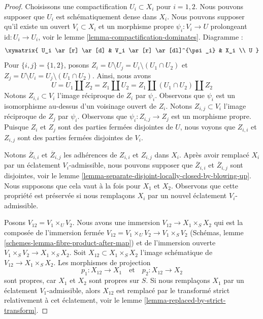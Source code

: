 \begin{proof}
Choisissons une compactification $U_i \subset X_i$ pour $i = 1, 2$. Nous pouvons
supposer que $U_i$ est schématiquement dense dans $X_i$. Nous pouvons supposer qu'il
existe un ouvert $V_i \subset X_i$ et un morphisme propre
$\psi_i : V_i \to U$ prolongeant $\text{id} : U_i \to U_i$, voir
le lemme \ref{lemma-compactification-dominates}. Diagramme :
$$
\xymatrix{
U_i \ar[r] \ar[d] & V_i \ar[r] \ar[dl]^{\psi_i} & X_i \\
U
}
$$
Pour $\{i, j\} = \{1, 2\}$, posons
$Z_i = U \setminus U_j = U_i \setminus (U_1 \cap U_2)$
et
$Z_j = U \setminus U_i = U_j \setminus (U_1 \cap U_2)$.
Ainsi, nous avons
$$
U = U_1 \amalg Z_2 = Z_1 \amalg U_2 = Z_1 \amalg (U_1 \cap U_2) \amalg Z_2
$$
Notons $Z_{i, i} \subset V_i$ l'image réciproque de $Z_i$ par $\psi_i$.
Observons que $\psi_i$ est un isomorphisme au-dessus d'un voisinage ouvert de $Z_i$.
Notons $Z_{i, j} \subset V_i$ l'image réciproque de $Z_j$ par $\psi_i$.
Observons que $\psi_i : Z_{i, j} \to Z_j$ est un morphisme propre.
Puisque $Z_i$ et $Z_j$ sont des parties fermées disjointes de
$U$, nous voyons que $Z_{i, i}$ et $Z_{i, j}$ sont des parties fermées disjointes
de $V_i$.

\medskip\noindent
Notons $\overline{Z}_{i, i}$ et $\overline{Z}_{i, j}$ les adhérences de
$Z_{i, i}$ et $Z_{i, j}$ dans $X_i$. Après avoir remplacé $X_i$ par un
éclatement $V_i$-admissible, nous pouvons supposer que
$\overline{Z}_{i, i}$ et $\overline{Z}_{i, j}$ sont disjointes, voir
le lemme \ref{lemma-separate-disjoint-locally-closed-by-blowing-up}.
Nous supposons que cela vaut à la fois pour $X_1$ et $X_2$.
Observons que cette propriété est préservée si nous remplaçons $X_i$
par un nouvel éclatement $V_i$-admissible.

\medskip\noindent
Posons $V_{12} = V_1 \times_U V_2$. Nous avons une immersion
$V_{12} \to X_1 \times_S X_2$ qui est la composée de l'immersion fermée
$V_{12} = V_1 \times_U V_2 \to V_1 \times_S V_2$
(Schémas, lemme \ref{schemes-lemma-fibre-product-after-map})
et de l'immersion ouverte $V_1 \times_S V_2 \to X_1 \times_S X_2$.
Soit $X_{12} \subset X_1 \times_S X_2$ l'image schématique
de $V_{12} \to X_1 \times_S X_2$. Les morphismes de projection
$$
p_1 : X_{12} \to X_1
\quad\text{et}\quad
p_2 : X_{12} \to X_2
$$
sont propres, car $X_1$ et $X_2$ sont propres sur $S$. Si nous remplaçons $X_1$ par un
éclatement $V_1$-admissible, alors $X_{12}$ est remplacé par
le transformé strict relativement à cet éclatement, voir
le lemme \ref{lemma-replaced-by-strict-transform}.


\end{proof}

